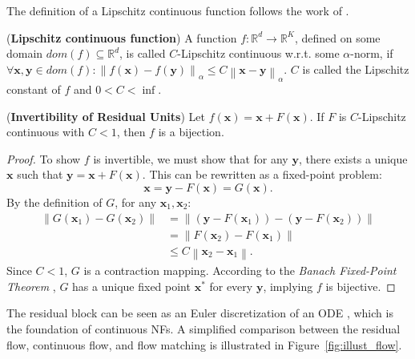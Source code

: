 The definition of a Lipschitz continuous function follows the work of \citeauthor{khalil2002nonlinear} \citeyearpar{khalil2002nonlinear}.
\begin{definition}
(\textbf{Lipschitz continuous function}) A function $f:\mathbb{R}^d\rightarrow\mathbb{R}^K$, defined on some domain $dom(f)\subseteq \mathbb{R}^d$, is called $C$-Lipschitz continuous w.r.t. some $\alpha$-norm, if $\forall \boldsymbol{x}, \boldsymbol{y} \in dom(f):\left\| f(\boldsymbol{x})-f(\boldsymbol{y})\right\|_{\alpha}\leq C\left\| \boldsymbol{x}-\boldsymbol{y}\right\|_{\alpha}$. $C$ is called the Lipschitz constant of $f$ and $0<C<\inf$.
\end{definition}

\begin{lemma}\label{lem:invertibility}(\textbf{Invertibility of Residual Units}) 
    Let $f(\mathbf{x}) = \mathbf{x} + F(\mathbf{x})$. If $F$ is $C$-Lipschitz continuous with $C < 1$, then $f$ is a bijection.
\end{lemma}
\begin{proof}
    To show $f$ is invertible, we must show that for any $\mathbf{y}$, there exists a unique $\mathbf{x}$ such that $\mathbf{y} = \mathbf{x} + F(\mathbf{x})$. This can be rewritten as a fixed-point problem:
    \begin{equation}
    \mathbf{x} = \mathbf{y} - F(\mathbf{x}) = G(\mathbf{x}).
    \end{equation}
    By the definition of $G$, for any $\mathbf{x}_1, \mathbf{x}_2$:
    \begin{align}
    \left\|G(\mathbf{x}_1) - G(\mathbf{x}_2)\right\| &= \left\|(\mathbf{y} - F(\mathbf{x}_1)) - (\mathbf{y} - F(\mathbf{x}_2))\right\| \\
    &= \left\|F(\mathbf{x}_2) - F(\mathbf{x}_1)\right\| \\
    &\leq C \left\|\mathbf{x}_2 - \mathbf{x}_1\right\|.
    \end{align}
    Since $C < 1$, $G$ is a contraction mapping. According to the \textit{Banach Fixed-Point Theorem} \citep{Shukla2016}, $G$ has a unique fixed point $\mathbf{x}^*$ for every $\mathbf{y}$, implying $f$ is bijective.
\end{proof}

The residual block can be seen as an Euler discretization of an \ac{ODE} \citep{lu2020finitelayer, ruthotto2018deep, haber2017stable}, which is the foundation of continuous \acp{NF}. A simplified comparison between the residual flow, continuous flow, and flow matching is illustrated in Figure~\ref{fig:illust_flow}.

